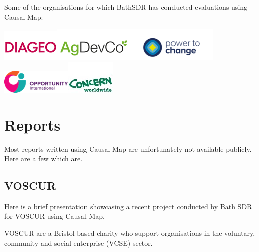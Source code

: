 \documentclass[
]{book}
\begin{document}
Some of the organisations for which BathSDR has conducted evaluations using Causal Map:

\href{https://causalmap.app/algo/}{\includegraphics{_assets/algo.png}}\href{https://causalmap.app/2logo/}{\includegraphics{_assets/2logo.png}}\href{https://causalmap.app/3logo/}{\includegraphics{_assets/3logo.png}} \href{https://causalmap.app/logo7-2/}{\includegraphics{_assets/logo7-1.png}}\href{https://causalmap.app/4logo/}{\includegraphics{_assets/4logo.jpg}}

\hypertarget{reports}{%
\section{Reports}\label{reports}}

Most reports written using Causal Map are unfortunately not available publicly. Here are a few which are.

\hypertarget{voscur}{%
\subsection{VOSCUR}\label{voscur}}

\href{https://drive.google.com/file/d/1DHXpmgfvMRw11Ejqv8l-LXrpzJTsVZFY/view}{Here} is a brief presentation showcasing a recent project conducted by Bath SDR for VOSCUR using Causal Map.

VOSCUR are a Bristol-based charity who support organisations in the voluntary, community and social enterprise (VCSE) sector.
\end{document}
